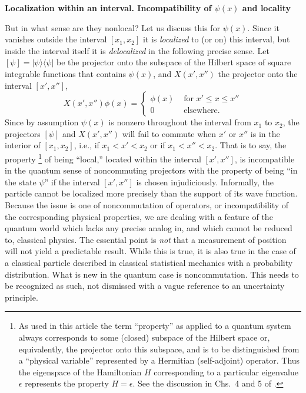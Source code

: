 \documentclass[10pt]{article} %
\def\outl#1{\par{\medskip\noindent\hspace*{.5cm}\bf
      \mathversion{bold}#1\mathversion{normal}\smallskip} }
\def\np{} \def\xa{} \def\xb{} \def\xn{} \def\xp{}
\def\outl#1{} \def\np{} \def\xa{} \def\xb{} \def\xn{} \def\xp{}
\def\outl#1{\par{\medskip\noindent\hspace*{.5cm}\bf
      \mathversion{bold}#1\mathversion{normal}\smallskip} }
\def\np{\newpage }\def\xn{\nopagebreak }\def\xp{\pagebreak }
\newcommand{\dya}[1]{|#1\rgl\lgl#1|}
\newcommand{\lgl}{\langle }
\newcommand{\rgl}{\rangle }
\newcommand{\ep}{\epsilon}
\begin{document}
\xb
\outl{Localization within an interval. Incompatibility of $\psi(x)$ and
  locality}
\xa



But in what sense are they nonlocal? Let us discuss this for $\psi(x)$. Since
it vanishes outside the interval $[x_1,x_2]$ it is \emph{localized} to (or on)
this interval, but inside the interval itself it is \emph{delocalized} in the
following precise sense.  Let $[\psi] =\dya{\psi}$ be the projector onto the
subspace of the Hilbert space of square integrable functions that contains
$\psi(x)$, and $X(x',x'')$ the projector onto the interval $[x',x'']$,
\begin{equation}
  X(x',x'')\phi(x) = 
\begin{cases}
\phi(x) &\text{ for $x'\leq x \leq x''$}\\ 
0 &\text{ elsewhere.}
\end{cases}
\label{eqn1}
\end{equation}
Since by assumption $\psi(x)$ is nonzero throughout the interval from $x_1$ to
$x_2$, the projectors $[\psi]$ and $X(x',x'')$ will fail to commute when $x'$
or $x''$ is in the interior of $[x_1,x_2]$, i.e., if $x_1<x'<x_2$ or if $x_1 <
x'' < x_2$.  That is to say, the property%
\footnote{As used in this article the term ``property'' as applied to a
  quantum system always corresponds to some (closed) subspace of the Hilbert
  space or, equivalently, the projector onto this subspace, and is to be
  distinguished from a ``physical variable'' represented by a Hermitian
  (self-adjoint) operator.  Thus the eigenspace of the Hamiltonian $H$
  corresponding to a particular eigenvalue $\ep$ represents the property
  $H=\ep$.  See the discussion in Chs.~4 and 5 of \cite{Grff02c}.} %
of being ``local,'' located within the interval $[x',x'']$, is incompatible in
the quantum sense of noncommuting projectors with the property of being ``in
the state $\psi$'' if the interval $[x',x'']$ is chosen
injudiciously. Informally, the particle cannot be localized more precisely
than the support of its wave function.  Because the issue is one of
noncommutation of operators, or incompatibility of the corresponding physical
properties, we are dealing with a feature of the quantum world
which lacks any precise analog in, and which cannot be reduced to, classical
physics.  The essential point is \emph{not} that a measurement of position
will not yield a predictable result.  While this is true, it is also true in
the case of a classical particle described in classical statistical mechanics
with a probability distribution.  What is new in the quantum case is
noncommutation. This needs to be recognized as such, not dismissed with a
vague reference to an uncertainty principle.
\end{document}
